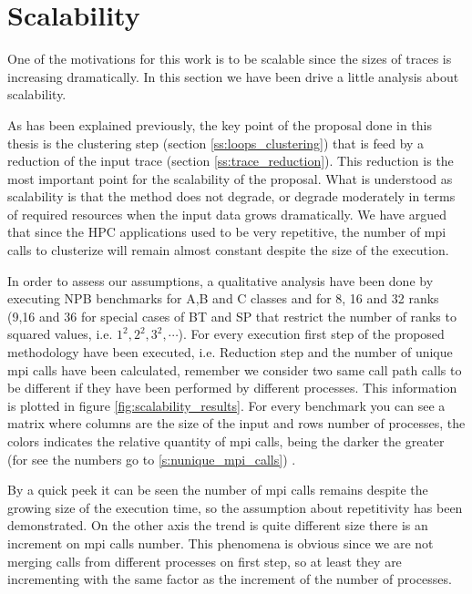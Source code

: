 \section{Scalability}\label{s:scalability}

One of the motivations for this work is to be scalable since the sizes of traces
is increasing dramatically. In this section we have been drive a little analysis
about scalability. 

As has been explained previously, the key point of the proposal done in this
thesis is the clustering step (section \ref{ss:loops_clustering}) that is feed
by a reduction of the input trace (section \ref{ss:trace_reduction}). This
reduction is the most important point for the scalability of the proposal. What
is understood as scalability is that the method does not degrade, or degrade
moderately in terms of required resources when the input data grows
dramatically. We have argued that since the HPC applications used to be very
repetitive, the number of mpi calls to clusterize will remain almost constant
despite the size of the execution. 

In order to assess our assumptions, a qualitative analysis have been done by
executing NPB benchmarks for A,B and C classes and for 8, 16 and 32 ranks (9,16
and 36 for special cases of BT and SP that restrict the number of ranks to
squared values, i.e. $1^{2}, 2^{2}, 3^{2}, \cdots$). For every execution first
step of the proposed methodology have been executed, i.e. Reduction step and
the number of unique mpi calls have been calculated, remember we consider two
same call path calls to be different if they have been performed by different
processes. This information is plotted
in figure \ref{fig:scalability_results}. For every benchmark you can see a
matrix where columns are the size of the input and rows number of processes, the
colors indicates the relative quantity of mpi calls, being the darker the
greater (for see the numbers go to \ref{s:nunique_mpi_calls}) . 

By a quick peek it can be seen the number of mpi calls remains despite the
growing size of the execution time, so the assumption about repetitivity has 
been demonstrated. On the other axis the trend is quite different size there is
an increment on mpi calls number. This phenomena is obvious since we are not
merging calls from different processes on first step, so at least they are
incrementing with the same factor as the increment of the number of processes.

